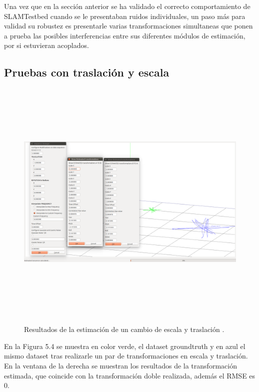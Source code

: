 Una vez que en la sección anterior se ha validado el correcto comportamiento de SLAMTestbed cuando se le presentaban ruidos individuales, un paso más para validad su robustez es presentarle varias transformaciones simultaneas que ponen a prueba las posibles interferencias entre sus diferentes módulos de estimación, por si estuvieran acoplados.

\subsection{Pruebas con traslación y escala}

\begin{figure}[h]
\begin{center}
\label{fig:traslaEscalaTest}\includegraphics[height=12.0cm,width=18.0cm]{img/cap6/Escala_Traslacion_abba.png}
\hspace{0.5cm}

\end{center}

\caption{Resultados de la estimación de un cambio de escala y traslación .}
\end{figure}

En la Figura 5.4 se muestra en color verde, el dataset groundtruth y en azul el mismo dataset tras realizarle un par de transformaciones en escala y traslación.
En la ventana de la derecha se muestran los resultados de la transformación estimada, que coincide con la transformación doble realizada, además el RMSE es 0.

